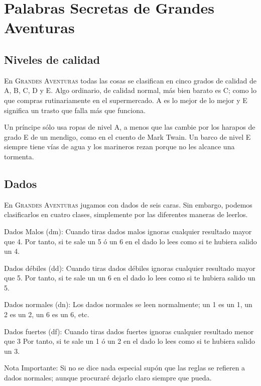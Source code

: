 \chapter{Palabras Secretas de Grandes Aventuras}

\section{Niveles de calidad}

En \textsc{Grandes Aventuras} todas las cosas se clasifican en cinco grados de calidad de A, B, C, D y E. Algo ordinario, de calidad normal, más bien barato es C; como lo que compras rutinariamente en el supermercado. A es lo mejor de lo mejor y E significa un trasto que falla más que funciona.

Un príncipe sólo usa ropas de nivel A, a menos que las cambie por los harapos de grado E de un mendigo, como en el cuento de Mark Twain. Un barco de nivel E siempre tiene vías de agua y los marineros rezan porque no les alcance una tormenta. 

\section{Dados}

En \textsc{Grandes Aventuras} jugamos con dados de seis caras. Sin embargo, podemos clasificarlos en cuatro clases, simplemente por las diferentes maneras de leerlos.

\begin{description}

\item{Dados Malos (dm):}
Cuando tiras dados malos ignoras cualquier resultado mayor que 4. Por tanto, si te sale un 5 ó un 6 en el dado lo lees como si te hubiera salido un 4.

\item{Dados débiles (dd):}
Cuando tiras dados débiles ignoras cualquier resultado mayor que 5. Por tanto, si te sale un un 6 en el dado lo lees como si te hubiera salido un 5.

\item{Dados normales (dn):}
Los dados normales se leen normalmente; un 1 es un 1, un 2 es un 2, un 6 es un 6, etc. 

\item{Dados fuertes (df):} 
Cuando tiras dados fuertes ignoras cualquier resultado menor que 3 Por tanto, si te sale un 1 ó un 2 en el dado lo lees como si te hubiera salido un 3.

\item{Nota Importante: }
Si no se dice nada especial supón que las reglas se refieren a dados normales; aunque procuraré dejarlo claro siempre que pueda.

\end{description}

